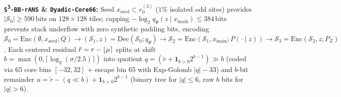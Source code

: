 \noindent\textbf{\texttt{S\textsuperscript{3}-BB-rANS} \& \texttt{Dyadic-Core66}:} Seed $x_{\mathrm{seed}} \subset r_0^{(3)}$ ($1\%$ isolated odd sites) provides $|\mathcal{S}_0| \ge 590\,\mathrm{bits}$ on $128\times 128$ tiles; capping $-\log_2 q_\Psi(z\mid x_{\mathrm{main}}) \le 384\,\mathrm{bits}$ prevents stack underflow with zero synthetic padding bits, encoding $\mathcal{S}_0 = \mathrm{Enc}(\emptyset,x_{\mathrm{seed}};Q) \to (\mathcal{S}_1,z)=\mathrm{Dec}(\mathcal{S}_0;q_\Psi) \to \mathcal{S}_2 = \mathrm{Enc}(\mathcal{S}_1,x_{\mathrm{main}};P(\cdot\mid z)) \to \mathcal{S}_3 = \mathrm{Enc}(\mathcal{S}_2,z;P_Z)$. Each centered residual $\tilde{r} = r - \lfloor \mu \rceil$ splits at shift $b = \max(0,\lceil \log_2(\sigma/2.5)\rceil)$ into quotient $q = (\tilde{r} + \mathbf{1}_{b>0}2^{b-1}) \gg b$ (coded via $65$ core bins $[-32,32]$ + escape bin $65$ with Exp-Golomb $|q|-33$) and $b$-bit remainder $u = \tilde{r} - (q\ll b) + \mathbf{1}_{b>0}2^{b-1}$ (binary tree for $|q|\le 6$, raw $b$ bits for $|q|>6$).
